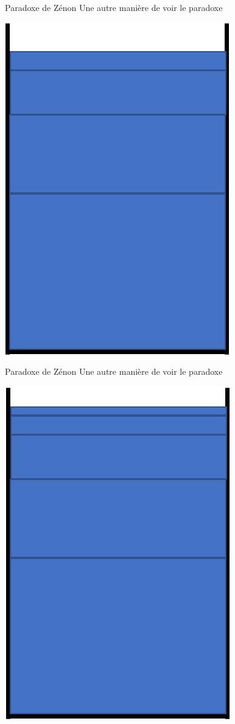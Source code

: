 \documentclass[11pt]{beamer}
\begin{document}
\begin{frame}{Paradoxe de Zénon}
Une autre manière de voir le paradoxe
\begin{center}
	\includegraphics[scale=0.5]{glass4.png}
\end{center}
\end{frame}
\begin{frame}{Paradoxe de Zénon}
Une autre manière de voir le paradoxe
\begin{center}
	\includegraphics[scale=0.5]{glass5.png}
\end{center}
\end{frame}
\end{document}

